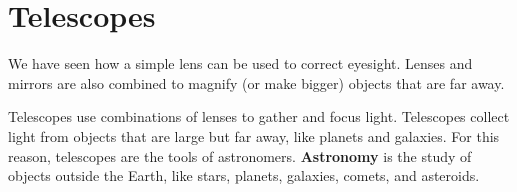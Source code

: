 

\section{Telescopes}

We have seen how a simple lens can be used to correct eyesight. Lenses and mirrors are also combined to magnify (or make bigger) objects that are far away.

Telescopes use combinations of lenses to gather and focus light. Telescopes collect light from objects that are large but far away, like planets and galaxies. For this reason, telescopes are the tools of astronomers. \textbf{Astronomy} is the study of objects outside the Earth, like stars, planets, galaxies, comets, and asteroids.

